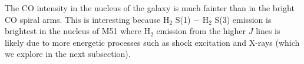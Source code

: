\documentclass[manuscript]{aastex}
\begin{document}
The CO intensity in the nucleus of the galaxy is much fainter than in the bright CO spiral arms.  This is interesting because $\mathrm{H_2}$ S(1) $-$ $\mathrm{H_2}$ S(3) emission is brightest in the nucleus of M51 where $\mathrm{H_2}$ emission from the higher $J$ lines is likely due to more energetic processes such as shock excitation and X-rays (which we explore in the next subsection).


\end{document}
